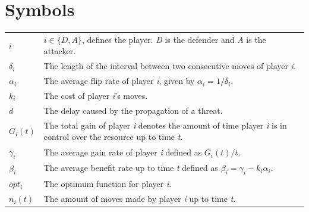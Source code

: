 \documentclass[master=cws, masteroption=vs,english]{kulemt}
\begin{document}
\section*{Symbols}
\begin{flushleft}
  \renewcommand{\arraystretch}{1.1}
  \begin{tabularx}{\textwidth}{@{}p{12mm}X@{}}
 $i$ & $i \in \{D,A\}$, defines the player. \textit{D} is the defender and \textit{A} is the attacker. \\
 $\delta_{i}$ & The length of the interval between two consecutive moves of player \textit{i}. \\
 $\alpha_{i}$ & The average flip rate of player \textit{i}, given by $\alpha_{i}=1/\delta_{i}$. \\
$k_{i}$ & The cost of player \textit{i}'s moves. \\
$d$ & The delay caused by the propagation of a threat. \\
 $G_{i}(t)$ & The total gain of player \textit{i} denotes the amount of time player \textit{i} is in control over the resource up to time \textit{t}. \\
$\gamma_{i}$ & The average gain rate of player \textit{i} defined as $G_{i}(t)/t$. \\
$\beta_{i}$ &  The average benefit rate up to time \textit{t} defined as  $\beta_{i} = \gamma_{i} -k_{i} \alpha_{i} $. \\
$opt_{i}$ & The optimum function for player \textit{i}. \\
$n_{i}(t)$ & The amount of moves made by player \textit{i} up to time \textit{t}. \\
  \end{tabularx}
\end{flushleft}

\mainmatter

%


%







%
%
%
%
%


%
%

\backmatter


\end{document}
